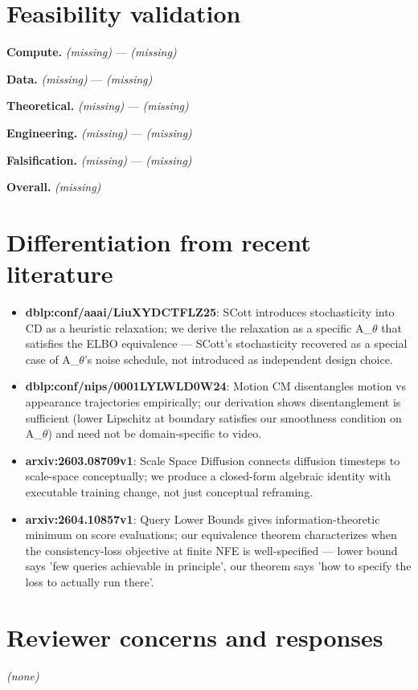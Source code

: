\documentclass[10pt,a4paper]{article}
\begin{document}
\begin{tcolorbox}[colback=bgskill, colframe=cblue, title=\textbf{NoveltySkill — Idea Card (L3 Oral-Ready)}, breakable]
\section*{Feasibility validation}
\textbf{Compute.} \emph{ \emph{(missing)} } — \emph{(missing)}

\textbf{Data.} \emph{ \emph{(missing)} } — \emph{(missing)}

\textbf{Theoretical.} \emph{ \emph{(missing)} } — \emph{(missing)}

\textbf{Engineering.} \emph{ \emph{(missing)} } — \emph{(missing)}

\textbf{Falsification.} \emph{ \emph{(missing)} } — \emph{(missing)}

\textbf{Overall.} \emph{ \emph{(missing)} }

\section*{Differentiation from recent literature}
\begin{itemize}[leftmargin=*]
  \item \textbf{dblp:conf/aaai/LiuXYDCTFLZ25}: SCott introduces stochasticity into CD as a heuristic relaxation; we derive the relaxation as a specific A\_$\theta$ that satisfies the ELBO equivalence --- SCott's stochasticity recovered as a special case of A\_$\theta$'s noise schedule, not introduced as independent design choice.
  \item \textbf{dblp:conf/nips/0001LYLWLD0W24}: Motion CM disentangles motion vs appearance trajectories empirically; our derivation shows disentanglement is sufficient (lower Lipschitz at boundary satisfies our smoothness condition on A\_$\theta$) and need not be domain-specific to video.
  \item \textbf{arxiv:2603.08709v1}: Scale Space Diffusion connects diffusion timesteps to scale-space conceptually; we produce a closed-form algebraic identity with executable training change, not just conceptual reframing.
  \item \textbf{arxiv:2604.10857v1}: Query Lower Bounds gives information-theoretic minimum on score evaluations; our equivalence theorem characterizes when the consistency-loss objective at finite NFE is well-specified --- lower bound says 'few queries achievable in principle', our theorem says 'how to specify the loss to actually run there'.
\end{itemize}

\section*{Reviewer concerns and responses}
\emph{(none)}

\end{tcolorbox}
\end{document}
